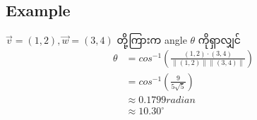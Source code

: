 \subsection{Example}
$\vec{v}=(1,2),\vec{w}=(3,4)$ တို့ကြားက angle $\theta$ ကိုရှာလျှင်
\[
    \begin{split}
        \theta&=cos^{-1}(\frac{(1,2)\cdot(3,4)}{\|(1,2)\|\|(3,4)\|}) \\
        &=cos^{-1}(\frac{9}{5\sqrt{5}}) \\
        &\approx 0.1799 radian \\
        &\approx 10.30^{\circ}
    \end{split}
\]